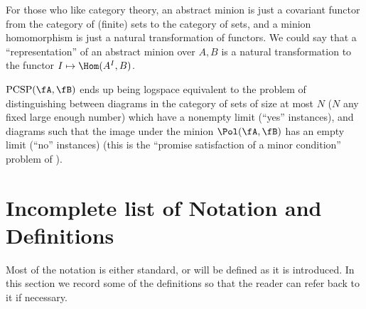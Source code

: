 \begin{rem} For those who like category theory, an abstract minion is just a covariant functor from the category of (finite) sets to the category of sets, and a minion homomorphism is just a natural transformation of functors. We could say that a ``representation'' of an abstract minion over $A,B$ is a natural transformation to the functor $I \mapsto \Hom(A^I,B)$.

$\operatorname{PCSP}(\fA,\fB)$ ends up being logspace equivalent to the problem of distinguishing between diagrams in the category of sets of size at most $N$ ($N$ any fixed large enough number) which have a nonempty limit (``yes'' instances), and diagrams such that the image under the minion $\Pol(\fA,\fB)$ has an empty limit (``no'' instances) (this is the ``promise satisfaction of a minor condition'' problem of \cite{pcsp-coloring-full}).
\end{rem}


\section{Incomplete list of Notation and Definitions}

Most of the notation is either standard, or will be defined as it is introduced. In this section we record some of the definitions so that the reader can refer back to it if necessary.

